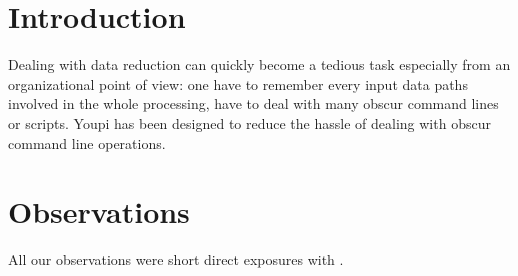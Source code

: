 \documentclass[11pt,twoside]{article}  %
\begin{document}

\section{Introduction}

Dealing with data reduction can quickly become a tedious task especially 
from an organizational point of view: one have to remember every input data 
paths involved in the whole processing, have to deal with many obscur command 
lines or scripts. Youpi has been designed to reduce the hassle of dealing with 
obscur command line operations.


\section{Observations}


All our observations were short direct exposures with
.
\end{document}
